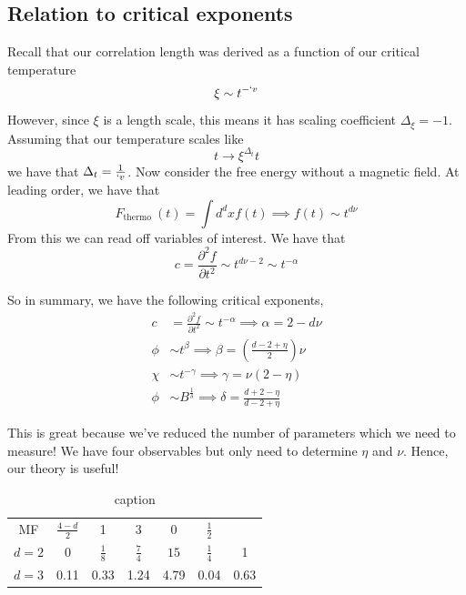 \documentclass[11pt, oneside]{article}   	%
\begin{document}
\subsection{Relation to critical exponents} 
Recall that our correlation length 
was derived as a function of our critical temperature 
\[
 \xi \sim t ^{  - `v }
\] However, since $ \xi $ is a length scale, this 
means it has scaling coefficient $ \Delta_\xi = - 1$. 
Assuming that our temperature scales like 
 \[
 t \to \xi^{ \Delta_t } t
\] we have that $ \Delta_t = \frac{1}{`v }$. 
Now consider the free energy without a magnetic field. 
At leading order, we have that 
\[
	F_{ \text{thermo } } ( t)  = \int d^ d x f( t) \implies f( t)  \sim t ^{ d \nu }
\] From this we can read off variables of interest. 
We have that 
\[
 c = \frac{\partial ^ 2 f }{\partial  t ^ 2 }  \sim t ^{ d \nu - 2 } \sim t ^{ - \alpha }
\]

So in summary, we have the following 
critical exponents, 
\begin{align*}
	c &=  \frac{\partial  ^ 2 f }{\partial   t^ 2 } \sim t ^{ - \alpha } \implies \alpha = 2 - d \nu  \\
	\phi  & \sim t ^ \beta \implies \beta = \left(  \frac{ d - 2 + \eta }{2} \right) \nu    \\
	\chi & \sim t ^{ - \gamma } \implies \gamma = \nu ( 2 - \eta ) \\
	\phi & \sim B ^{ \frac{1}{ \delta } } \implies \delta = \frac{ d + 2 - \eta }{ d - 2 + \eta }
\end{align*}

This is great because we've reduced the 
number of parameters which we need to measure! We have 
four observables but only need to determine $ \eta $ and $ \nu $. 
Hence, 
our theory is useful!

\begin{table}[htpb]
	\centering
	\caption{caption}
	\label{tab:label}
	\begin{tabular}{c | c c c c c c }
		MF & $ \frac{ 4 - d }{ 2 } $ & 1 & 3 & 0 & $\frac{1}{2 } $ \\
		$ d =  2 $ & 0  & $ \frac{1}{8 } $  & $ \frac{7}{4 } $ &  $ 15 $ & $\frac{1}{4 } $ & 1 \\
		$ d = 3 $ & 0.11 & 0.33 & 1.24 & 4.79 & 0.04 & 0.63 \\ 
	\end{tabular}
\end{table}
\end{document}
